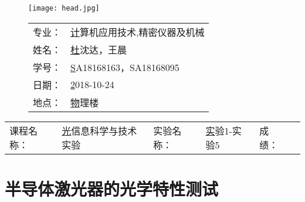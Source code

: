 \documentclass{zjureport}
\newcommand{\major}{计算机应用技术,精密仪器及机械}
\newcommand{\name}{杜沈达，王晨}
\newcommand{\stuid}{SA18168163，SA18168095}
\newcommand{\newdate}{2018-10-24}
\newcommand{\loc}{物理楼}
\newcommand{\course}{光信息科学与技术实验}
\newcommand{\grades}{}
\newcommand{\newtitle}{实验1-实验5}
\newcommand{\exptype}{验证计算实验}
\begin{document}
\thispagestyle{empty}
\begin{figure}[h]
  \begin{minipage}{0.6\linewidth}
    \centerline{\texttt{[image: head.jpg]}}
  \end{minipage}
  \hfill
  \begin{minipage}{.4\linewidth}
    \raggedleft
    \begin{tabular*}{.8\linewidth}{ll}
      专业： & \underline\major   \\
      姓名： & \underline\name    \\
      学号： & \underline\stuid   \\
      日期： & \underline\newdate \\
      地点： & \underline\loc
    \end{tabular*}
  \end{minipage}
\end{figure}

\begin{table}[!htbp]
  \centering
  \begin{tabular*}{\linewidth}{llllll}
    课程名称： & \underline\course   & 实验名称： & \underline\newtitle   & 成绩：       &  \underline\grades \\
  \end{tabular*}
\end{table}


\section{半导体激光器的光学特性测试}
\end{document}
